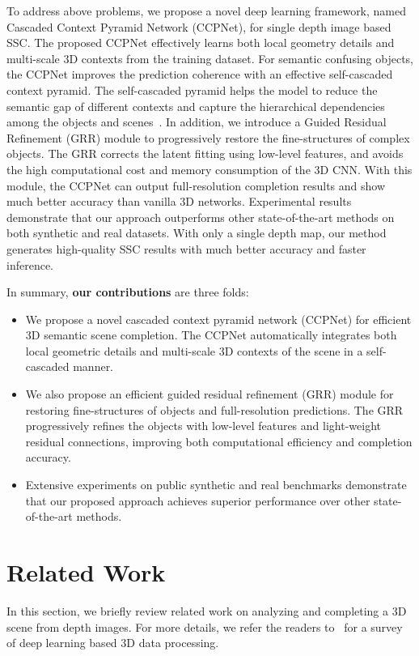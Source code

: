 \documentclass[10pt,twocolumn,letterpaper]{article}
\begin{document}
To address above problems, we propose a novel deep learning framework, named Cascaded Context Pyramid Network (CCPNet), for single depth image based SSC.
The proposed CCPNet effectively learns both local geometry details and multi-scale 3D contexts from the training dataset.
For semantic confusing objects, the CCPNet improves the prediction coherence with an effective self-cascaded context pyramid.
The self-cascaded pyramid helps the model to reduce the semantic gap of different contexts and capture the hierarchical dependencies among the objects and scenes~\cite{liu2018semantic}.
In addition, we introduce a Guided Residual Refinement (GRR) module to progressively restore the fine-structures of complex objects.
The GRR corrects the latent fitting using low-level features, and avoids the high computational cost and memory consumption of the 3D CNN.
With this module, the CCPNet can output full-resolution completion results and show much better accuracy than vanilla 3D networks.
Experimental results demonstrate that our approach outperforms other state-of-the-art methods on both synthetic and real datasets.
With only a single depth map, our method generates high-quality SSC results with much better accuracy and faster inference.

In summary, \textbf{our contributions} are three folds:
\begin{itemize}
\item
We propose a novel cascaded context pyramid network (CCPNet) for efficient 3D semantic scene completion.
The CCPNet automatically integrates both local geometric details and multi-scale 3D contexts of the scene in a self-cascaded manner.
\item
We also propose an efficient guided residual refinement (GRR) module for restoring fine-structures of objects and full-resolution predictions.
The GRR progressively refines the objects with low-level features and light-weight residual connections, improving both computational efficiency and completion accuracy.
\item
Extensive experiments on public synthetic and real benchmarks demonstrate that our proposed approach achieves superior performance over other state-of-the-art methods.
\end{itemize}
\vspace{-2mm}
\section{Related Work}
In this section, we briefly review related work on analyzing and completing a 3D scene from depth images.
For more details, we refer the readers to~\cite{ioannidou2017deep} for a survey of deep learning based 3D data processing.
\end{document}
